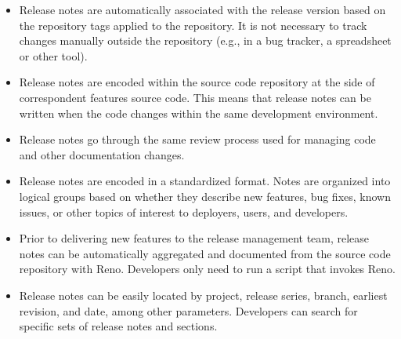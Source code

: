 \documentclass[dvipsnames]{bmcart}
\theoremstyle{definition}
\begin{document}
\begin{itemize}
 \item Release notes are automatically associated with the release version based on the repository tags applied to the repository. It is not necessary to track changes manually outside the repository (e.g., in a bug tracker, a spreadsheet or other tool).
 \item Release notes are encoded within the source code repository at the side of correspondent features source code. This means that release notes can be written when the code changes within the same development environment.
 \item Release notes go through the same review process used for managing code and other documentation changes.
 \item Release notes are encoded in a standardized format. Notes are organized into logical groups based on whether they describe new features, bug fixes, known issues, or other topics of interest to deployers, users, and developers. 
 \item Prior to delivering new features to the release management team, release notes can be automatically aggregated and documented from the source code repository with Reno.  Developers only need to run a script that invokes Reno. 
\item Release notes can be easily located by project, release series, branch, earliest revision, and date, among other parameters.  Developers can search for specific sets of release notes and sections. 
\end{itemize}
\end{document}
